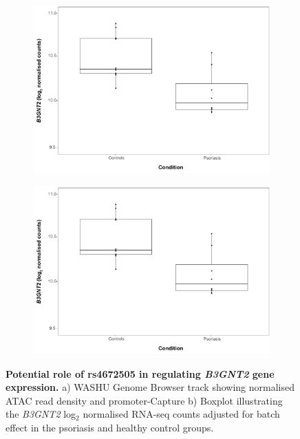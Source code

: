 \begin{figure}[htbp]
\centering
\begin{subfigure}{0.5\textwidth}
\centering
\includegraphics[width=\textwidth]{./Results2/pdfs/RNA_PS_CTL_B3GNT2_expression_CD8}
\caption{\textbf{}}
\end{subfigure}
\begin{subfigure}{0.5\textwidth}
\centering
\includegraphics[width=\textwidth]{./Results2/pdfs/RNA_PS_CTL_B3GNT2_expression_CD8}
\caption{\textbf{}}
\end{subfigure}
\caption[Potential role of rs4672505 in regulating \textit{B3GNT2} gene expression.]{\textbf{Potential role of rs4672505 in regulating \textit{B3GNT2} gene expression.} a) WASHU Genome Browser track showing normalised ATAC read density and promoter-Capture b) Boxplot illustrating the \textit{B3GNT2} log$_2$ normalised RNA-seq counts adjusted for batch effect in the psoriasis and healthy control groups.}
\label{figure:RNA_chromatin_interaction_B3GNT2}
\end{figure} 



